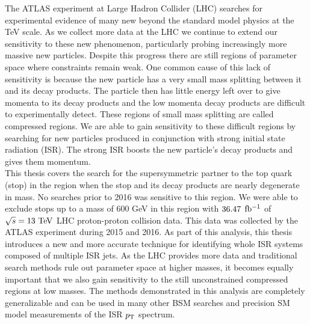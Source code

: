
\indent The ATLAS experiment at Large Hadron Collider (LHC) searches for experimental evidence of many new beyond the standard model physics at the TeV scale.   As we collect more data at the LHC we continue to extend our sensitivity to these new phenomenon, particularly probing increasingly more massive new particles.  Despite this progress there are still regions of parameter space where constraints remain weak.   One common cause of this lack of sensitivity is because the new particle has a very small mass splitting between it and its decay products.  The particle then has little energy left over to give momenta to its decay products and the low momenta decay products are difficult to experimentally detect. These regions of small mass splitting are called compressed regions.  We are able to gain sensitivity to these difficult regions by searching for new particles produced in conjunction with strong initial state radiation (ISR).  The strong ISR boosts the new particle's decay products and gives them momentum.  \\

\indent This thesis covers the search for the supersymmetric partner to the top quark (stop) in the region when the stop and its decay products are nearly degenerate in mass.  No searches prior to 2016 was sensitive to this region.  We were able to exclude stops up to a mass of 600 GeV in this region with $36.47$ $\mbox{fb$^{-1}$}$ of $\sqrt{s} = 13 \tev$ LHC proton-proton collision data.  This data was collected by the ATLAS experiment during 2015 and 2016.  As part of this analysis, this thesis introduces a new and more accurate technique for identifying whole ISR systems composed of multiple ISR jets.   As the LHC provides more data and traditional search methods rule out parameter space at higher masses, it becomes equally important that we also gain sensitivity to the still unconstrained compressed regions at low masses.  The methods demonstrated in this analysis are completely generalizable and can be used in many other BSM searches and precision SM model measurements of the ISR $p_{\mathrm{T}}$ spectrum.